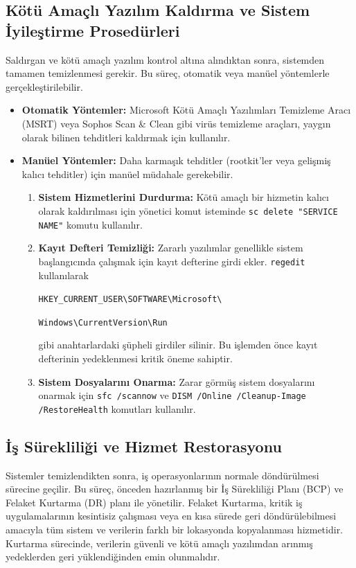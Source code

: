 \begin{itemize}
\begin{itemize}
\subsection{Kötü Amaçlı Yazılım Kaldırma ve Sistem İyileştirme Prosedürleri}

Saldırgan ve kötü amaçlı yazılım kontrol altına alındıktan sonra, sistemden tamamen temizlenmesi gerekir. Bu süreç, otomatik veya manüel yöntemlerle gerçekleştirilebilir.

\begin{itemize}
    \item \textbf{Otomatik Yöntemler:} Microsoft Kötü Amaçlı Yazılımları Temizleme Aracı (MSRT) veya Sophos Scan \& Clean gibi virüs temizleme araçları, yaygın olarak bilinen tehditleri kaldırmak için kullanılır.
    \item \textbf{Manüel Yöntemler:} Daha karmaşık tehditler (rootkit'ler veya gelişmiş kalıcı tehditler) için manüel müdahale gerekebilir.
    \begin{enumerate}
        \item \textbf{Sistem Hizmetlerini Durdurma:} Kötü amaçlı bir hizmetin kalıcı olarak kaldırılması için yönetici komut isteminde \texttt{sc delete "SERVICE NAME"} komutu kullanılır.
        \item \textbf{Kayıt Defteri Temizliği:} Zararlı yazılımlar genellikle sistem başlangıcında çalışmak için kayıt defterine girdi ekler. \texttt{regedit} kullanılarak 
        
        \texttt{HKEY\_CURRENT\_USER\textbackslash{}SOFTWARE\textbackslash{}Microsoft\textbackslash{}}
        
        \texttt{Windows\textbackslash{}CurrentVersion\textbackslash{}Run} 
        
        gibi anahtarlardaki şüpheli girdiler silinir. Bu işlemden önce kayıt defterinin yedeklenmesi kritik öneme sahiptir.
        \item \textbf{Sistem Dosyalarını Onarma:} Zarar görmüş sistem dosyalarını onarmak için \texttt{sfc /scannow} ve \texttt{DISM /Online /Cleanup-Image /RestoreHealth} komutları kullanılır.
    \end{enumerate}
\end{itemize}

\subsection{İş Sürekliliği ve Hizmet Restorasyonu}

Sistemler temizlendikten sonra, iş operasyonlarının normale döndürülmesi sürecine geçilir. Bu süreç, önceden hazırlanmış bir İş Sürekliliği Planı (BCP) ve Felaket Kurtarma (DR) planı ile yönetilir. Felaket Kurtarma, kritik iş uygulamalarının kesintisiz çalışması veya en kısa sürede geri döndürülebilmesi amacıyla tüm sistem ve verilerin farklı bir lokasyonda kopyalanması hizmetidir. Kurtarma sürecinde, verilerin güvenli ve kötü amaçlı yazılımdan arınmış yedeklerden geri yüklendiğinden emin olunmalıdır.


\end{itemize}
\end{itemize}
